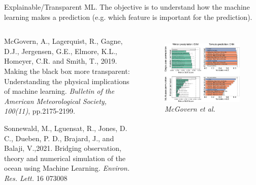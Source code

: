 \documentclass[handout, 10pt]{beamer}
\newcommand{\rref}[1][]{\hfill{\scriptsize\textit{#1}}}
\begin{document}
\begin{frame}{Explainable/Transparent ML.}
The objective is to understand how the machine learning makes a prediction (e.g. which feature is important for the prediction).
\begin{columns}

\begin{itemize}
{\small 

    \item McGovern, A., Lagerquist, R., Gagne, D.J., Jergensen, G.E., Elmore, K.L., Homeyer, C.R. and Smith, T., 2019. Making the black box more transparent: Understanding the physical implications of machine learning. {\it Bulletin of the American Meteorological Society, 100(11)}, pp.2175-2199.

    \item Sonnewald, M., Lguensat, R., Jones, D. C., Dueben, P. D., Brajard, J., and Balaji, V.,2021. Bridging observation, theory and numerical simulation of the ocean using Machine Learning. {\it Environ. Res. Lett.} 16 073008}
    
\end{itemize}
\begin{figure}
    \centering
    \includegraphics[width=\textwidth]{fig/full-bams-d-18-0195.1-f3.jpg}\\
\rref[McGovern et al.]
\end{figure}
\end{columns}

\end{frame}
\end{document}
